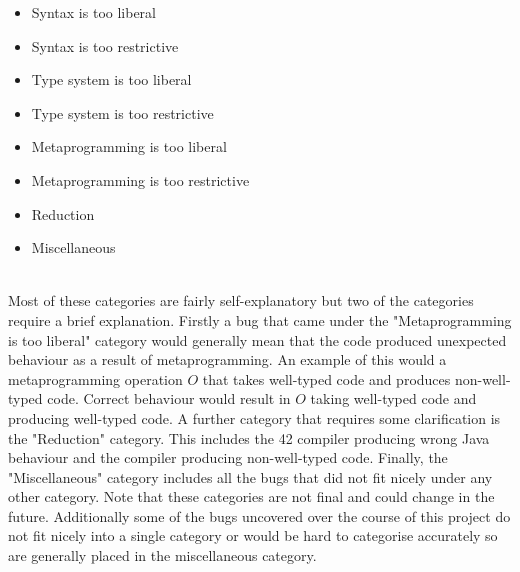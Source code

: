 \begin{itemize}
	\item{Syntax is too liberal}
	\item{Syntax is too restrictive}
	\item{Type system is too liberal}
	\item{Type system is too restrictive}
	\item{Metaprogramming is too liberal}
	\item{Metaprogramming is too restrictive}
	\item{Reduction}
	\item{Miscellaneous}
\end{itemize}
~\\
Most of these categories are fairly self-explanatory but two of the categories require a brief explanation. Firstly a bug that came under the "Metaprogramming is too liberal" category would generally mean that the code produced unexpected behaviour as a result of metaprogramming. An example of this would a metaprogramming operation $O$ that takes well-typed code and produces non-well-typed code. Correct behaviour would result in $O$ taking well-typed code and producing well-typed code. A further category that requires some clarification is  the "Reduction" category. This includes the 42 compiler producing wrong Java behaviour and the compiler producing non-well-typed code. Finally, the "Miscellaneous" category includes all the bugs that did not fit nicely under any other category. Note that these categories are not final and could change in the future. Additionally some of the bugs uncovered over the course of this project do not fit nicely into a single category or would be hard to categorise accurately so are generally placed in the miscellaneous category.




